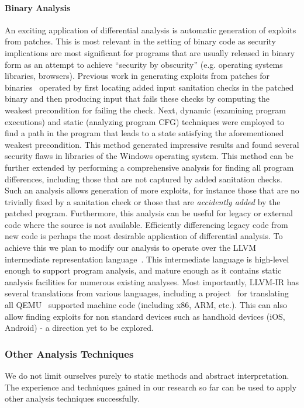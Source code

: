 \paragraph{Binary Analysis}
An exciting application of differential analysis is automatic generation of exploits from patches. This is most relevant in the setting of binary code as security implications are most significant for programs that are usually released in binary form as an attempt to achieve ``security by obscurity'' (e.g. operating systems libraries, browsers). Previous work in generating exploits from patches for binaries~\cite{BrumleyPoosankamSongZheng08} operated by first locating added input sanitation checks in the patched binary and then producing input that fails these checks by computing the weakest precondition for failing the check. Next, dynamic (examining program executions) and static (analyzing program CFG) techniques were employed to find a path in the program that leads to a state satisfying the aforementioned weakest precondition. This method generated impressive results and found several security flaws in libraries of the Windows operating system. This method can be further extended by performing a comprehensive analysis for finding all program differences, including those that are not captured by added sanitation checks. Such an analysis allows generation of more exploits, for instance those that are no trivially fixed by a sanitation check or those that are \emph{accidently added} by the patched program. Furthermore, this analysis can be useful for legacy or external code where the source is not available. Efficiently differencing legacy code from new code is perhaps the most desirable application of differential analysis. To achieve this we plan to modify our analysis to operate over the LLVM intermediate representation language~\cite{LattnerAdve04}. This intermediate language is high-level enough to support program analysis, and mature enough as it contains static analysis facilities for numerous existing analyses. Most importantly, LLVM-IR has several translations from various languages, including a project~\cite{Scheller:2009} for translating all QEMU~\cite{Bellard05} supported machine code (including x86, ARM, etc.). This can also allow finding exploits for non standard devices such as handhold devices (iOS, Android) - a direction yet to be explored.

\subsubsection{Other Analysis Techniques}
We do not limit ourselves purely to static methods and abstract interpretation. The experience and techniques gained in our research so far can be used to apply other analysis techniques successfully.

